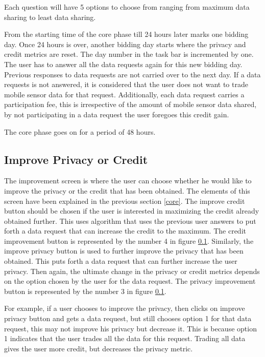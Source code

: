 Each question will have 5 options to choose from ranging from maximum data sharing to least data sharing.

From the starting time of the core phase till 24 hours later marks one bidding day. Once 24 hours is over, another bidding day starts where the privacy and credit metrics are reset. The day number in the task bar is incremented by one. The user has to answer all the data requests again for this new bidding day. Previous responses to data requests are not carried over to the next day. If a data requests is not answered, it is considered that the user does not want to trade mobile sensor data for that request. Additionally, each data request carries a participation fee, this is irrespective of the amount of mobile sensor data shared, by not participating in a data request the user foregoes this credit gain.

The core phase goes on for a period of 48 hours. 


\subsection{Improve Privacy or Credit}

The improvement screen is where the user can choose whether he would like to improve the privacy or the credit that has been obtained. The elements of this screen  have been explained in the previous section \ref{core}.
The improve credit button
should be chosen if the user is interested in maximizing the credit already obtained further. This uses algorithm that uses the previous user answers to
put forth a data request that can increase the credit to the maximum. The credit improvement button is represented by the number 4 in figure \ref{}. Similarly, the improve privacy button is used to further improve the privacy that has been obtained. This puts forth a data request that can further increase the user privacy. Then again, the ultimate change in the privacy or credit metrics depends on
the option chosen by the user for the data request. The privacy improvement button is represented by the number 3 in figure \ref{}.

For example, if a user chooses to improve the privacy, then clicks on improve privacy button and gets a data request, but still chooses option 1 for that data request, this may not improve his privacy but decrease it. This is because option 1 indicates that the user trades all the data for this request. Trading all data gives the user more credit, but decreases the privacy metric.

